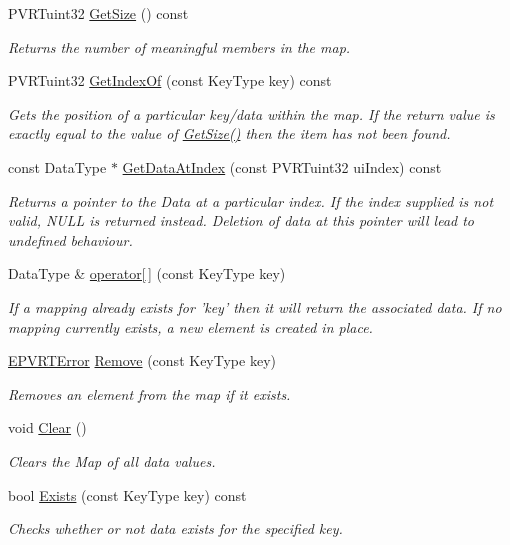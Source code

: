 \begin{DoxyCompactItemize}
\item 
P\+V\+R\+Tuint32 \hyperlink{singleton_c_p_v_r_t_map_a67f47bb5387fbe8b409b30ece5dde06e}{Get\+Size} () const 
\begin{DoxyCompactList}\small\item\em Returns the number of meaningful members in the map. \end{DoxyCompactList}\item 
P\+V\+R\+Tuint32 \hyperlink{singleton_c_p_v_r_t_map_a9ec486b393c3289e6f16d372247234fa}{Get\+Index\+Of} (const Key\+Type key) const 
\begin{DoxyCompactList}\small\item\em Gets the position of a particular key/data within the map. If the return value is exactly equal to the value of \hyperlink{singleton_c_p_v_r_t_map_a67f47bb5387fbe8b409b30ece5dde06e}{Get\+Size()} then the item has not been found. \end{DoxyCompactList}\item 
const Data\+Type $\ast$ \hyperlink{singleton_c_p_v_r_t_map_a5375b86c1aafa0dfeb3b03e92ff46a32}{Get\+Data\+At\+Index} (const P\+V\+R\+Tuint32 ui\+Index) const 
\begin{DoxyCompactList}\small\item\em Returns a pointer to the Data at a particular index. If the index supplied is not valid, N\+U\+L\+L is returned instead. Deletion of data at this pointer will lead to undefined behaviour. \end{DoxyCompactList}\item 
Data\+Type \& \hyperlink{singleton_c_p_v_r_t_map_aece60f89358c054599a2878104405210}{operator\mbox{[}$\,$\mbox{]}} (const Key\+Type key)
\begin{DoxyCompactList}\small\item\em If a mapping already exists for 'key' then it will return the associated data. If no mapping currently exists, a new element is created in place. \end{DoxyCompactList}\item 
\hyperlink{_p_v_r_t_error_8h_a9e837ff1a83f3a5f332bc4cc78454608}{E\+P\+V\+R\+T\+Error} \hyperlink{singleton_c_p_v_r_t_map_a6fae78bce2b89a6fe484ef87a9755ef6}{Remove} (const Key\+Type key)
\begin{DoxyCompactList}\small\item\em Removes an element from the map if it exists. \end{DoxyCompactList}\item 
void \hyperlink{singleton_c_p_v_r_t_map_a57bdb7b0c05259b925c08245c35bedac}{Clear} ()
\begin{DoxyCompactList}\small\item\em Clears the Map of all data values. \end{DoxyCompactList}\item 
bool \hyperlink{singleton_c_p_v_r_t_map_ae0f21eef4c5f71a21a57e352a31f9b75}{Exists} (const Key\+Type key) const 
\begin{DoxyCompactList}\small\item\em Checks whether or not data exists for the specified key. \end{DoxyCompactList}\end{DoxyCompactItemize}


